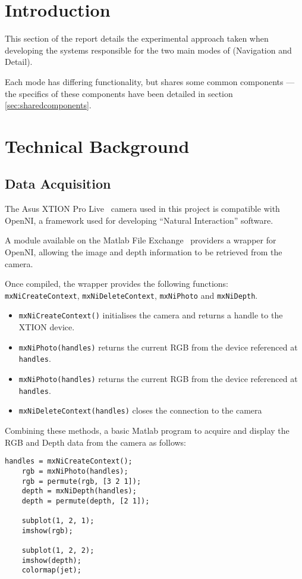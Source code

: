 \section{Introduction}
This section of the report details the experimental approach taken when developing the systems responsible for the two main modes of (Navigation and Detail).

Each mode has differing functionality, but shares some common components --- the specifics of these components have been detailed in section \ref{sec:sharedcomponents}.   

\section{Technical Background}
\subsection{Data Acquisition}
The Asus XTION Pro Live~\cite{xtion} camera used in this project is compatible with OpenNI, a framework used for developing ``Natural Interaction'' software.

A module available on the Matlab File Exchange~\cite{matlabwrapper} providers a wrapper for OpenNI, allowing the image and depth information to be retrieved from the camera.

Once compiled, the wrapper provides the following functions: \lstinline|mxNiCreateContext|, \lstinline|mxNiDeleteContext|, \lstinline|mxNiPhoto| and \lstinline|mxNiDepth|.

\begin{itemize}
    \item \lstinline|mxNiCreateContext()| initialises the camera and returns a handle to the XTION device.
    \item \lstinline|mxNiPhoto(handles)| returns the current \ac{RGB} from the device referenced at \lstinline|handles|.
    \item \lstinline|mxNiPhoto(handles)| returns the current \ac{RGB} from the device referenced at \lstinline|handles|.
    \item \lstinline|mxNiDeleteContext(handles)| closes the connection to the camera 
\end{itemize}

Combining these methods, a basic Matlab program to acquire and display the RGB and Depth data from the camera as follows: 

\begin{lstlisting}[caption = {Acquiring Depth and RGB in Matlab}]
    handles = mxNiCreateContext();
    rgb = mxNiPhoto(handles);
    rgb = permute(rgb, [3 2 1]);
    depth = mxNiDepth(handles);
    depth = permute(depth, [2 1]);

    subplot(1, 2, 1);
    imshow(rgb);

    subplot(1, 2, 2);
    imshow(depth);
    colormap(jet);
\end{lstlisting}

